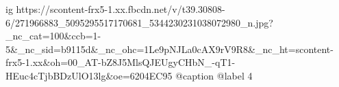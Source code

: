  
 
 
 
 

\ifcmt
  ig https://scontent-frx5-1.xx.fbcdn.net/v/t39.30808-6/271966883_5095295517170681_5344230231038072980_n.jpg?_nc_cat=100&ccb=1-5&_nc_sid=b9115d&_nc_ohc=1Le9pNJLa0cAX9rV9R8&_nc_ht=scontent-frx5-1.xx&oh=00_AT-bZ8J5MlsQJEUgyCHbN_-qT1-HEuc4cTjbBDzUlO13lg&oe=6204EC95
  @caption @label 4
\fi

